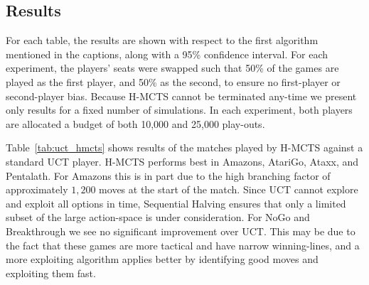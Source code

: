 \documentclass[a4paper]{llncs}
\begin{document}
\subsection{Results}
\label{subsec:results}

For each table, the results are shown with respect to the first algorithm mentioned in the captions, along with a 95\% confidence interval. For each experiment, the players' seats were swapped such that 50\% of the games are played as the first player, and 50\% as the second, to ensure no first-player or second-player bias. Because H-MCTS cannot be terminated any-time we present only results for a fixed number of simulations. In each experiment, both players are allocated a budget of both 10,000 and 25,000 play-outs.

\begin{table}[b]
\centering
\tabcolsep=0.3cm
\vspace{3mm}
{\caption{H-MCTS vs. UCT with random play-outs, 1,000 games} \label{tab:uct_hmcts}}
\end{table}

Table~\ref{tab:uct_hmcts} shows results of the matches played by H-MCTS against a standard UCT player. H-MCTS performs best in Amazons, AtariGo, Ataxx, and Pentalath. For Amazons this is in part due to the high branching factor of approximately $1,200$ moves at the start of the match. Since UCT cannot explore and exploit all options in time, Sequential Halving ensures that only a limited subset of the large action-space is under consideration. For NoGo and Breakthrough we see no significant improvement over UCT. This may be due to the fact that these games are more tactical and have narrow winning-lines, and a more exploiting algorithm applies better by identifying good moves and exploiting them fast.
\end{document}
